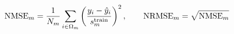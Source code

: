 \documentclass{article}
\begin{document}
\fontsize{22}{29}\selectfont
\[
\mathrm{NMSE}_m=\frac1{N_m}\sum_{i\in\Omega_m}\left(\frac{y_i-\hat y_i}{s_m^{\rm train}}\right)^2,\qquad \mathrm{NRMSE}_m=\sqrt{\mathrm{NMSE}_m}
\]
\end{document}
